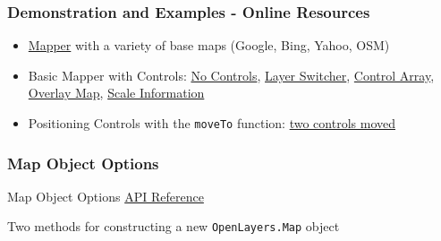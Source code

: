 \documentclass[]{article}
\begin{document}
\subsubsection{Demonstration and Examples - Online
Resources}\label{demonstration-and-examples---online-resources}

\begin{itemize}
\itemsep1pt\parskip0pt
\item
  \href{http://karlbenedict.com/presentations/2014-04-NMGIC/examples/openLayers02_proprietary.html}{Mapper}
  with a variety of base maps (Google, Bing, Yahoo, OSM)
\item
  Basic Mapper with Controls:
  \href{http://karlbenedict.com/presentations/2014-04-NMGIC/examples/openLayers03_none.html}{No
  Controls},
  \href{http://karlbenedict.com/presentations/2014-04-NMGIC/examples/openLayers03_layerSwitcher.html}{Layer
  Switcher},
  \href{http://karlbenedict.com/presentations/2014-04-NMGIC/examples/openLayers03_controlArray.html}{Control
  Array},
  \href{http://karlbenedict.com/presentations/2014-04-NMGIC/examples/openLayers03_Overlay.html}{Overlay
  Map},
  \href{http://karlbenedict.com/presentations/2014-04-NMGIC/examples/openLayers03_Scale.html}{Scale
  Information}
\item
  Positioning Controls with the \texttt{moveTo} function:
  \href{http://karlbenedict.com/presentations/2014-04-NMGIC/examples/openLayers04_MovedControls.html}{two
  controls moved}
\end{itemize}

\subsubsection{Map Object Options}\label{map-object-options}

Map Object Options
\href{http://dev.openlayers.org/releases/OpenLayers-2.13/doc/apidocs/files/OpenLayers/Map-js.html}{API
Reference}

Two methods for constructing a new \texttt{OpenLayers.Map} object
\end{document}
